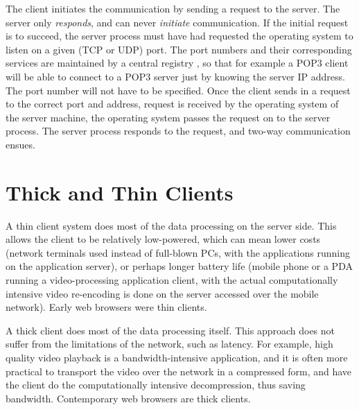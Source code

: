 \documentclass[10pt]{report}
\begin{document}
The client initiates the communication by sending a request to the
server.  The server only {\em responds}, and can never {\em initiate}
communication.  If the initial request is to succeed, the server process
must have had requested the operating system to listen on a given (TCP
or UDP) port.  The port numbers and their corresponding services are
maintained by a central registry \cite{iana}, so that for example a POP3
client will be able to connect to a POP3 server just by knowing the
server IP address.  The port number will not have to be specified.
Once the client sends in a request to the correct port and address,
request is received by the operating system of the server machine, the
operating system passes the request on to the server process.  The
server process responds to the request, and two-way communication
ensues.


\section{Thick and Thin Clients}

A thin client system does most of the data processing on the server side.  This allows the client to be relatively low-powered, which can mean lower costs (network terminals used instead of full-blown PCs, with the applications running on the application server), or perhaps longer battery life (mobile phone or a PDA running a video-processing application client, with the actual computationally intensive video re-encoding is done on the server accessed over the mobile network).  Early web browsers were thin clients.

A thick client does most of the data processing itself.  This approach
does not suffer from the limitations of the network, such as latency.
For example, high quality video playback is a bandwidth-intensive
application, and it is often more practical to transport the video over
the network in a compressed form, and have the client do the
computationally intensive decompression, thus saving bandwidth.
Contemporary web browsers are thick clients.


\end{document}
